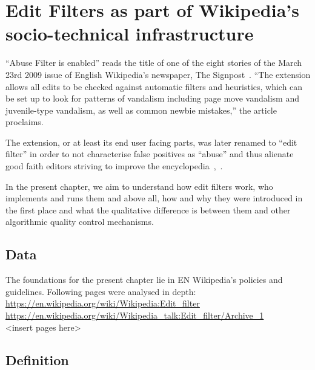 \chapter{Edit Filters as part of Wikipedia's socio-technical infrastructure}
\label{chap:filters}


``Abuse Filter is enabled'' reads the title of one of the eight stories of the March 23rd 2009 issue of English Wikipedia's newspaper, The Signpost~\cite{Signpost2009}.
``The extension allows all edits to be checked against automatic filters and heuristics, which can be set up to look for patterns of vandalism including page move vandalism and juvenile-type vandalism, as well as common newbie mistakes,'' the article proclaims.

The extension, or at least its end user facing parts, was later renamed to ``edit filter'' in order to not characterise false positives as ``abuse'' and thus alienate good faith editors striving to improve the encyclopedia~\cite{Wikipedia:EditFilter},~\cite{Wikipedia:EditFilterTalkArchiveNameChange}.

In the present chapter, we aim to understand how edit filters work, who implements and runs them and above all, how and why they were introduced in the first place and what the qualitative difference is between them and other algorithmic quality control mechanisms.

\section{Data}

The foundations for the present chapter lie in EN Wikipedia's policies and guidelines.
Following pages were analysed in depth: \\
\url{https://en.wikipedia.org/wiki/Wikipedia:Edit_filter} \\
\url{https://en.wikipedia.org/wiki/Wikipedia_talk:Edit_filter/Archive_1} \\
<insert pages here>


\section{Definition}


